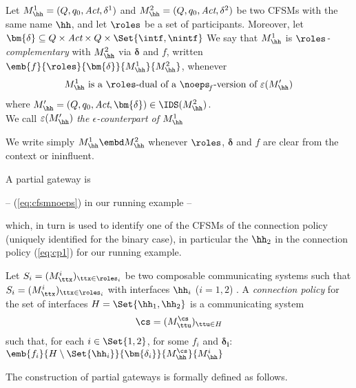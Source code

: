  \begin{definition}
\label{def:Pcomplementarity}
Let $M^1_\hh = (Q, q_0, \textit{Act}, \delta^1)$ and 
$M^2_\hh = (Q, q_0, \textit{Act}, \delta^2)$  
be two CFSMs with the same name $\hh$, and let $\roles$ be a set of participants.
Moreover, let $\bm{\delta} \subseteq Q\times\textit{Act}\times Q \times \Set{\intf,\nintf}$
We say that
$M^1_\hh$ is {\em $\roles$-complementary} with $M^2_\hh$ via $\bm{\delta}$ and $f$, 
written $\emb{f}{\roles}{\bm{\delta}}{M^1_\hh}{M^2_\hh}$, whenever 
$$M^1_\hh \text{ is a $\roles$-dual of a $\noeps_{\!f}$-version of } \varepsilon(M'_\hh)$$
where $M'_\hh= (Q, q_0, \textit{Act}, \bm{\delta})\in\IDS(M^2_\hh)$.\\
We call $\varepsilon(M'_\hh)$ {\em the $\epsilon$-counterpart of $M^1_\hh$}
\end{definition}

\noindent
We write simply $M^1_\hh \embd M^2_\hh$ whenever
$\roles$, $\bm\delta$ and $f$ are clear from the context or ininfluent.

A partial gateway is 

-- (\ref{eq:cfsmnoeps}) in our running example --

which, in turn is used to identify one of the CFSMs of the connection policy (uniquely identified
for the binary case), in particular the $\hh_2$ in the connection policy (\ref{eq:cp1})
for our running example.

 \begin{definition}\label{def:cp}
 Let $S_i=(M^i_{\ttx})_{\ttx\in\roles_i}$ be two composable communicating systems such that $S_i=(M^i_{\ttx})_{\ttx\in\roles_i}$  with interfaces $\hh_i$ ($i=1,2$) . 
 A {\em connection policy} for the set of interfaces $H=\Set{\hh_1,\hh_2}$ is a communicating system 
 $$\cs = (M^\cs_\ttu)_{\ttu\in H}$$ 
 such that,
 for each $i\in\Set{1,2}$, for some $f_i$ and $\bm{\delta_i}$: \  $\emb{f_i}{H\setminus\Set{\hh_i}}{\bm{\delta_i}}{M^\cs_\hh}{M^i_\hh}$\\
\end{definition}


The construction of partial gateways is formally defined as follows.


